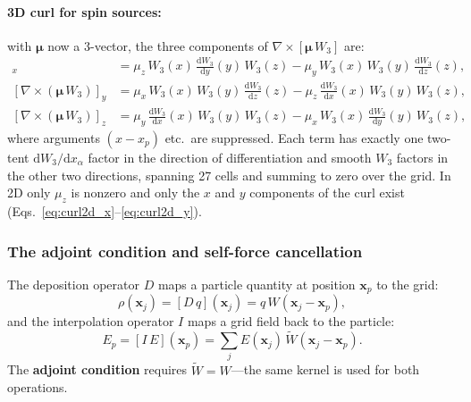 \documentclass[11pt,a4paper]{article}
\newcommand{\vv}[1]{\mathbf{#1}}
\newcommand{\dd}{\mathrm{d}}
\begin{document}
\paragraph{3D curl for spin sources:} with $\boldsymbol{\mu}$ now a 3-vector, the three components of $\nabla\times[\boldsymbol{\mu}\,W_3]$ are:
\begin{align}
  [\nabla\times(\boldsymbol{\mu}\,W_3)]_x &= \mu_z\,W_3(x)\,\tfrac{\dd W_3}{\dd y}(y)\,W_3(z)
                                           - \mu_y\,W_3(x)\,W_3(y)\,\tfrac{\dd W_3}{\dd z}(z), \\
  [\nabla\times(\boldsymbol{\mu}\,W_3)]_y &= \mu_x\,W_3(x)\,W_3(y)\,\tfrac{\dd W_3}{\dd z}(z)
                                           - \mu_z\,\tfrac{\dd W_3}{\dd x}(x)\,W_3(y)\,W_3(z), \\
  [\nabla\times(\boldsymbol{\mu}\,W_3)]_z &= \mu_y\,\tfrac{\dd W_3}{\dd x}(x)\,W_3(y)\,W_3(z)
                                           - \mu_x\,W_3(x)\,\tfrac{\dd W_3}{\dd y}(y)\,W_3(z),
\end{align}
where arguments $(x-x_p)$ etc.\ are suppressed.  Each term has exactly one two-tent $\dd W_3/\dd x_\alpha$ factor in the direction of differentiation and smooth $W_3$ factors in the other two directions, spanning 27 cells and summing to zero over the grid.  In 2D only $\mu_z$ is nonzero and only the $x$ and $y$ components of the curl exist (Eqs.~\ref{eq:curl2d_x}--\ref{eq:curl2d_y}).

\subsubsection*{The adjoint condition and self-force cancellation}

The deposition operator $D$ maps a particle quantity at position $\vv{x}_p$ to the grid:
\begin{equation}
  \rho(\vv{x}_j) = [D\,q](\vv{x}_j) = q\,W(\vv{x}_j - \vv{x}_p),
\end{equation}
and the interpolation operator $I$ maps a grid field back to the particle:
\begin{equation}
  E_p = [I\,E](\vv{x}_p) = \sum_j E(\vv{x}_j)\,\tilde{W}(\vv{x}_j - \vv{x}_p).
\end{equation}
The \textbf{adjoint condition} requires $\tilde{W} = W$---the same kernel is used for both operations.
\end{document}
